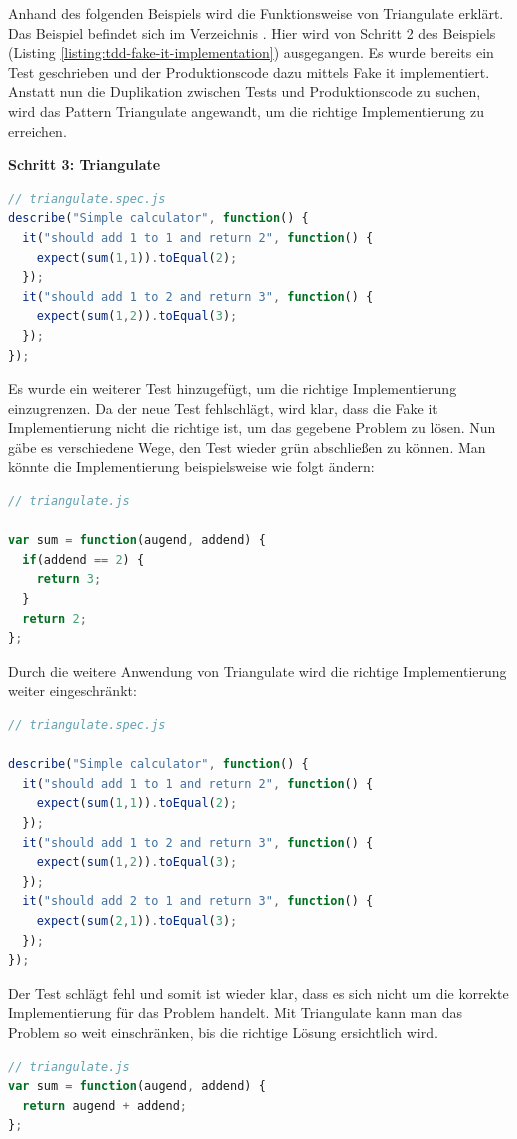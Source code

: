 Anhand des folgenden Beispiels wird die Funktionsweise von Triangulate erklärt. Das Beispiel befindet sich im Verzeichnis .
Hier wird von Schritt 2 des  Beispiels (Listing \ref{listing:tdd-fake-it-implementation}) ausgegangen. Es wurde bereits ein Test geschrieben und der Produktionscode dazu mittels Fake it implementiert. Anstatt nun die Duplikation zwischen Tests und Produktionscode zu suchen, wird das Pattern Triangulate angewandt, um die richtige Implementierung zu erreichen.

\vspace{0.5cm}
\textbf{Schritt 3: Triangulate}
\begin{lstlisting}[language=JavaScript, caption=TDD - Triangulate]
// triangulate.spec.js
describe("Simple calculator", function() {
  it("should add 1 to 1 and return 2", function() {
    expect(sum(1,1)).toEqual(2);
  });
  it("should add 1 to 2 and return 3", function() {
    expect(sum(1,2)).toEqual(3);
  });
});
\end{lstlisting}

Es wurde ein weiterer Test hinzugefügt, um die richtige Implementierung einzugrenzen. Da der neue Test fehlschlägt, wird klar, dass die Fake it Implementierung nicht die richtige ist, um das gegebene Problem zu lösen. Nun gäbe es verschiedene Wege, den Test wieder grün abschließen zu können. Man könnte die Implementierung beispielsweise wie folgt ändern:

\begin{lstlisting}[language=JavaScript, caption=TDD - Triangulate - Implementation]
// triangulate.js

var sum = function(augend, addend) {
  if(addend == 2) {
    return 3;
  }
  return 2;
};
\end{lstlisting}

Durch die weitere Anwendung von Triangulate wird die richtige Implementierung weiter eingeschränkt:
\begin{lstlisting}[language=JavaScript, caption=TDD - Triangulate - 2]
// triangulate.spec.js

describe("Simple calculator", function() {
  it("should add 1 to 1 and return 2", function() {
    expect(sum(1,1)).toEqual(2);
  });
  it("should add 1 to 2 and return 3", function() {
    expect(sum(1,2)).toEqual(3);
  });
  it("should add 2 to 1 and return 3", function() {
    expect(sum(2,1)).toEqual(3);
  });
});

\end{lstlisting}
Der Test schlägt fehl und somit ist wieder klar, dass es sich nicht um die korrekte Implementierung für das Problem handelt. Mit Triangulate kann man das Problem so weit einschränken, bis die richtige Lösung ersichtlich wird.
\begin{lstlisting}[language=JavaScript, caption=TDD - Triangulate - Implementation - 2]
// triangulate.js
var sum = function(augend, addend) {
  return augend + addend;
};
\end{lstlisting}

